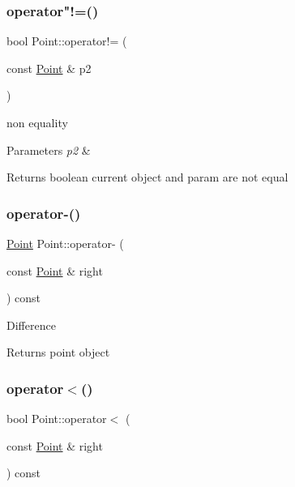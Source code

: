 \subsubsection{\texorpdfstring{operator"!=()}{operator!=()}}
{\footnotesize\ttfamily bool Point\+::operator!= (\begin{DoxyParamCaption}\item[{const \mbox{\hyperlink{class_point}{Point}} \&}]{p2 }\end{DoxyParamCaption})}

non equality 
\begin{DoxyParams}{Parameters}
{\em p2} & \\
\hline
\end{DoxyParams}
\begin{DoxyReturn}{Returns}
boolean current object and param are not equal 
\end{DoxyReturn}
\mbox{\label{class_point_aa3b47f3a3a36f3653f0b1e26dd197257}} 
\subsubsection{\texorpdfstring{operator-\/()}{operator-()}}
{\footnotesize\ttfamily \mbox{\hyperlink{class_point}{Point}} Point\+::operator-\/ (\begin{DoxyParamCaption}\item[{const \mbox{\hyperlink{class_point}{Point}} \&}]{right }\end{DoxyParamCaption}) const}

Difference \begin{DoxyReturn}{Returns}
point object 
\end{DoxyReturn}
\mbox{\label{class_point_a2d285a505e84d64a96974d5247e8ae7a}} 
\subsubsection{\texorpdfstring{operator$<$()}{operator<()}}
{\footnotesize\ttfamily bool Point\+::operator$<$ (\begin{DoxyParamCaption}\item[{const \mbox{\hyperlink{class_point}{Point}} \&}]{right }\end{DoxyParamCaption}) const}

